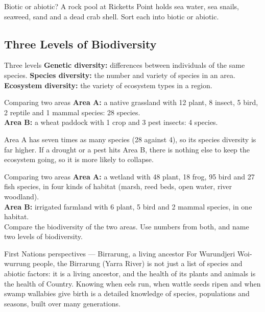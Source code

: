 \begin{wedo}{Biotic or abiotic?}
A rock pool at Ricketts Point holds sea water, sea snails, seaweed, sand and a dead crab shell. Sort each into biotic or abiotic.
\answerbox{4cm}
\end{wedo}

\subsection{Three Levels of Biodiversity}\label{sub:5.2}

\begin{skillbox}{Three levels}
\textbf{Genetic diversity:} differences between individuals of the same species. \quad \textbf{Species diversity:} the number and variety of species in an area. \quad \textbf{Ecosystem diversity:} the variety of ecosystem types in a region.
\end{skillbox}

\begin{workedex}{Comparing two areas}
\textbf{Area A:} a native grassland with 12 plant, 8 insect, 5 bird, 2 reptile and 1 mammal species: 28 species.\\
\textbf{Area B:} a wheat paddock with 1 crop and 3 pest insects: 4 species.

\smallskip
Area A has seven times as many species (28 against 4), so its species diversity is far higher. If a drought or a pest hits Area B, there is nothing else to keep the ecosystem going, so it is more likely to collapse.
\end{workedex}

\begin{wedo}{Comparing two areas}
\textbf{Area A:} a wetland with 48 plant, 18 frog, 95 bird and 27 fish species, in four kinds of habitat (marsh, reed beds, open water, river woodland).\\
\textbf{Area B:} irrigated farmland with 6 plant, 5 bird and 2 mammal species, in one habitat.\\
Compare the biodiversity of the two areas. Use numbers from both, and name two levels of biodiversity.
\answerbox{5cm}
\end{wedo}

\begin{countrybox}{First Nations perspectives --- Birrarung, a living ancestor}
For Wurundjeri Woi-wurrung people, the Birrarung (Yarra River) is not just a list of species and abiotic factors: it is a living ancestor, and the health of its plants and animals is the health of Country. Knowing when eels run, when wattle seeds ripen and when swamp wallabies give birth is a detailed knowledge of species, populations and seasons, built over many generations.
\end{countrybox}

